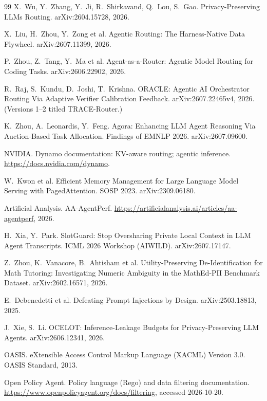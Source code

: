 \documentclass[11pt]{article}
\begin{document}
\begin{thebibliography}{99}
 X.~Wu, Y.~Zhang, Y.~Ji, R.~Shirkavand, Q.~Lou, S.~Gao. Privacy-Preserving LLMs
Routing. arXiv:2604.15728, 2026.

 X.~Liu, H.~Zhou, Y.~Zong et al. Agentic Routing: The Harness-Native Data
Flywheel. arXiv:2607.11399, 2026.

 P.~Zhou, Z.~Tang, Y.~Ma et al. Agent-as-a-Router: Agentic Model Routing
for Coding Tasks. arXiv:2606.22902, 2026.

 R.~Raj, S.~Kundu, D.~Joshi, T.~Krishna. ORACLE: Agentic AI Orchestrator Routing
Via Adaptive Verifier Calibration Feedback. arXiv:2607.22465v4, 2026. (Versions 1--2 titled
TRACE-Router.)

 K.~Zhou, A.~Leonardis, Y.~Feng. Agora: Enhancing LLM Agent Reasoning Via
Auction-Based Task Allocation. Findings of EMNLP 2026. arXiv:2607.09600.

 NVIDIA. Dynamo documentation: KV-aware routing; agentic inference.
\url{https://docs.nvidia.com/dynamo}.

 W.~Kwon et al. Efficient Memory Management for Large Language Model
Serving with PagedAttention. SOSP 2023. arXiv:2309.06180.

 Artificial Analysis. AA-AgentPerf.
\url{https://artificialanalysis.ai/articles/aa-agentperf}, 2026.

 H.~Xia, Y.~Park. SlotGuard: Stop Oversharing Private Local Context in LLM
Agent Transcripts. ICML 2026 Workshop (AIWILD). arXiv:2607.17147.

 Z.~Zhou, K.~Vanacore, B.~Ahtisham et al. Utility-Preserving De-Identification
for Math Tutoring: Investigating Numeric Ambiguity in the MathEd-PII Benchmark Dataset.
arXiv:2602.16571, 2026.

 E.~Debenedetti et al. Defeating Prompt Injections by Design. arXiv:2503.18813,
2025.

 J.~Xie, S.~Li. OCELOT: Inference-Leakage Budgets for Privacy-Preserving LLM
Agents. arXiv:2606.12341, 2026.

 OASIS. eXtensible Access Control Markup Language (XACML) Version 3.0. OASIS
Standard, 2013.

 Open Policy Agent. Policy language (Rego) and data filtering documentation.
\url{https://www.openpolicyagent.org/docs/filtering}, accessed 2026-10-20.


\end{thebibliography}
\end{document}
